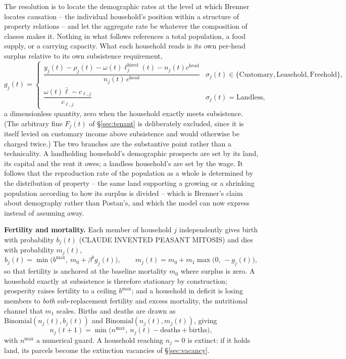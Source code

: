 \documentclass[11pt,english]{article}
\begin{document}
The resolution is to locate the demographic rates at the level at which Brenner locates causation -- the individual household's position within a structure of property relations -- and let the aggregate rate be whatever the composition of classes makes it. Nothing in what follows references a total population, a food supply, or a carrying capacity. What each household reads is its own per-head surplus relative to its own subsistence requirement,
\begin{equation}
g_j(t) = \begin{cases}
\dfrac{y_j(t) - \rho_j(t) - \omega(t)\ell_j^{\text{hired}}(t) - n_j(t)c^{\text{head}}}{n_j(t)\,c^{\text{head}}} & \sigma_j(t)\in\{\text{Customary},\text{Leasehold},\text{Freehold}\},\\[10pt]
\dfrac{\omega(t)\bar\ell - c_{\ell,j}}{c_{\ell,j}} & \sigma_j(t)=\text{Landless},
\end{cases}
\label{eq:surplus}
\end{equation}
a dimensionless quantity, zero when the household exactly meets subsistence. (The arbitrary fine $F_j(t)$ of \S\ref{sec:tenant} is deliberately excluded, since it is itself levied on customary income above subsistence and would otherwise be charged twice.) The two branches are the substantive point rather than a technicality. A landholding household's demographic prospects are set by its land, its capital and the rent it owes; a landless household's are set by the wage. It follows that the reproduction rate of the population as a whole is determined by the distribution of property -- the same land supporting a growing or a shrinking population according to how its surplus is divided -- which is Brenner's claim about demography rather than Postan's, and which the model can now express instead of assuming away.

\textbf{Fertility and mortality.} Each member of household $j$ independently gives birth with probability $b_j(t)$ (CLAUDE INVENTED PEASANT MITOSIS) and dies with probability $m_j(t)$,
\begin{equation}
b_j(t) = \min\big(b^{\max},\ m_0 + \beta^{b} g_j(t)\big), \qquad
m_j(t) = m_0 + m_1\max\big(0,\,-g_j(t)\big),
\label{eq:vital}
\end{equation}
so that fertility is anchored at the baseline mortality $m_0$ where surplus is zero. A household exactly at subsistence is therefore stationary by construction; prosperity raises fertility to a ceiling $b^{\max}$; and a household in deficit is losing members to \emph{both} sub-replacement fertility and excess mortality, the nutritional channel that $m_1$ scales. Births and deaths are drawn as $\text{Binomial}(n_j(t), b_j(t))$ and $\text{Binomial}(n_j(t), m_j(t))$, giving
\begin{equation}
n_j(t+1) = \min\big(n^{\max},\ n_j(t) - \text{deaths} + \text{births}\big),
\end{equation}
with $n^{\max}$ a numerical guard. A household reaching $n_j=0$ is extinct: if it holds land, its parcels become the extinction vacancies of \S\ref{sec:vacancy}.
\end{document}
